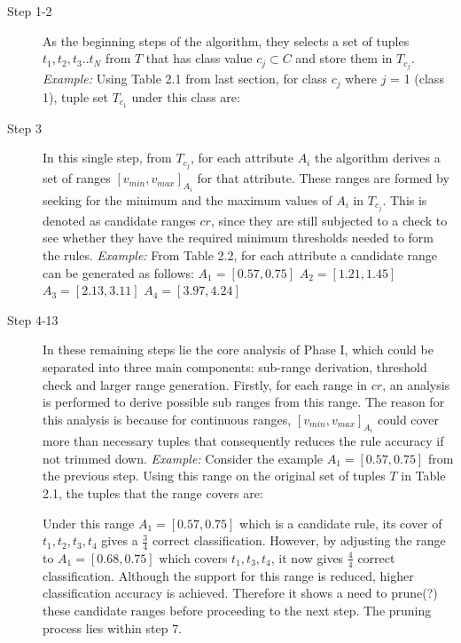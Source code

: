 \begin{description}
\item[Step 1-2] As the beginning steps of the algorithm, they selects a set of tuples $t_1, t_2, t_3..t_N$ from $T$ that has class value $c_j \subset C$ and store them in $T_{c_j}$. 
\textit{Example: } Using Table 2.1 from last section, for class $c_j$ where $j$ = 1 (class 1), tuple set $T_{c_1}$ under this class are: 

 

\item[Step 3] In this single step, from $T_{c_j}$, for each attribute $A_i$ the algorithm derives a set of ranges $[v_{min}, v_{max}]_{A_i}$ for that attribute. These ranges are formed by seeking for the minimum and the maximum values of $A_i$ in $T_{c_j}$. This is denoted as candidate ranges $cr$, since they are still subjected to a check to see whether they have the required minimum thresholds needed to form the rules. 
\textit{Example: } From Table 2.2, for each attribute a candidate range can be generated as follows: 
$A_1 = [0.57, 0.75]$ 
$A_2 = [1.21, 1.45]$ 
$A_3 = [2.13, 3.11]$ 
$A_4 = [3.97, 4.24]$ 

\item[Step 4-13] In these remaining steps lie the core analysis of Phase I, which could be separated into three main components: sub-range derivation, threshold check and larger range generation. Firstly, for each range in $cr$, an analysis is performed to derive possible sub ranges from this range. The reason for this analysis is because for continuous ranges, $[v_{min}, v_{max}]_{A_i}$ could cover more than necessary tuples that consequently reduces the rule accuracy if not trimmed down. 
\textit{Example: } Consider the example $A_1 = [0.57, 0.75]$ from the previous step. Using this range on the original set of tuples $T$ in Table 2.1, the tuples that the range covers are: 



Under this range $A_1 = [0.57, 0.75]$ which is a candidate rule, its cover of ${t_1,t_2,t_3,t_4}$ gives a $\frac{3}{4}$ correct classification. However, by adjusting the range to $A_1 = [0.68, 0.75]$ which covers ${t_1,t_3,t_4}$, it now gives $\frac{4}{4}$ correct classification. Although the support for this range is reduced, higher classification accuracy is achieved. Therefore it shows a need to prune(?) these candidate ranges before proceeding to the next step. The pruning process lies within step 7. 


\end{description}
